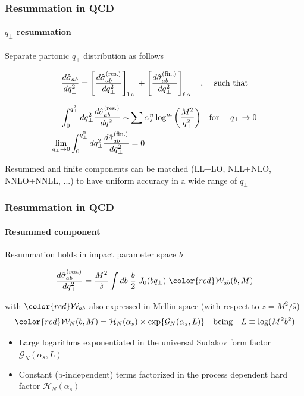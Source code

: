 \documentclass[aspectratio=43]{beamer}
\begin{document}
\begin{frame}

	\frametitle{Resummation in QCD}
	\framesubtitle{$q_{\perp}$ resummation}

	\footnotesize Separate partonic $q_{\perp}$ distribution as follows
	
	\begin{equation}
		\frac{d\hat{\sigma}_{ab}}{dq_{\perp}^{2}} =
		\Bigg[ \frac{d\hat{\sigma}^{\textrm{(res.)}}_{ab}}{dq_{\perp}^{2}} \Bigg]_{\textrm{l.a.}} + 
		\Bigg[ \frac{d\hat{\sigma}^{\textrm{(fin.)}}_{ab}}{dq_{\perp}^{2}} \Bigg]_{\textrm{f.o.}} \textrm{\quad, \quad such that} \nonumber
	\end{equation}

	\begin{align}
		\int_{0}^{q_{\perp}^{2}} dq_{\perp}^{2} \frac{d\hat{\sigma}^{\textrm{(res.)}}_{ab}}{dq_{\perp}^{2}} \sim & \sum \alpha_{s}^{n} \log^{m} \bigg( \frac{M^{2}}{q_{\perp}^{2}} \bigg) \textrm{\quad for \quad} q_{\perp} \rightarrow 0 \nonumber \\
		\lim_{q_{\perp} \rightarrow 0}\int_{0}^{q_{\perp}^{2}} dq_{\perp}^{2} \frac{d\hat{\sigma}^{\textrm{(fin.)}}_{ab}}{dq_{\perp}^{2}} &= 0 \nonumber 
	\end{align}

	\footnotesize Resummed and finite components can be matched (LL+LO, NLL+NLO,\\ NNLO+NNLL, ...) to have uniform accuracy in a wide range of $q_{\perp}$
\end{frame}

\begin{frame}

	\frametitle{Resummation in QCD}
	\framesubtitle{Resummed component}
	
	\footnotesize
	
	Resummation holds in impact parameter space $b$
	
	\begin{equation}
		\frac{d\hat{\sigma}_{ab}^{\textrm{(res.)}}}{dq_{\perp}^{2}} = \frac{M^{2}}{\hat{s}} \int db \; \frac{b}{2} \; J_{0}(b q_{\perp}) \; {\color{red} \mathcal{W}_{ab}(b, M)} \nonumber
	\end{equation}
	 
	with ${\color{red}\mathcal{W}_{ab}}$ also expressed in Mellin space (with respect to $z = M^{2}/\hat{s}$)
	\begin{equation}
		{\color{red} \mathcal{W}_{N}(b, M) = \mathcal{H}_{N}(\alpha_{s}) \times \exp\{\mathcal{G}_{N}(\alpha_{s}, L)\}} \quad\textrm{being}\quad L \equiv \log(M^{2}b^{2}) \nonumber
	\end{equation}

	\begin{itemize}
		\item Large logarithms exponentiated in the universal Sudakov form factor {\color{red}$\mathcal{G}_{N}(\alpha_{s}, L)$}
		\item Constant (b-independent) terms factorized in the process dependent hard factor {\color{red}$\mathcal{H}_{N}(\alpha_{s})$}
	\end{itemize}
	
\end{frame}
\end{document}
